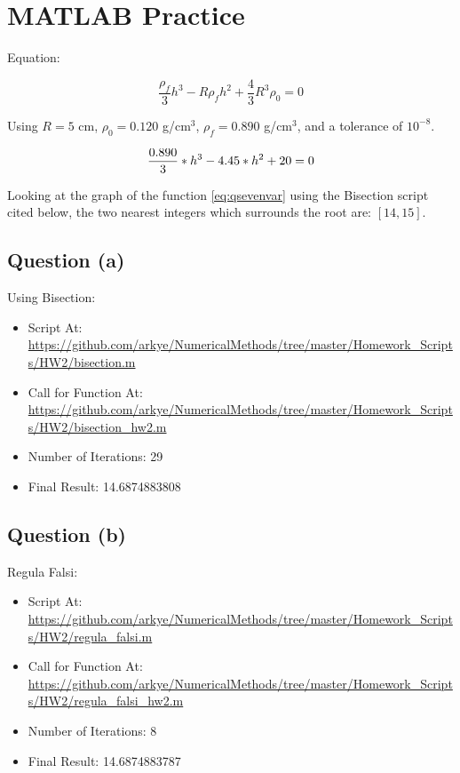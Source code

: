 \section{MATLAB Practice}
	Equation:
	
	\begin{equation}
		 \frac{\rho_{f}}{3}h^{3} - R \rho_{f}h^{2} + \frac{4}{3}R^{3} \rho_{0} = 0
	\label{eq:qseven}
	\end{equation}

	Using $R = 5$ cm, $\rho_{0} = 0.120$ g/cm$^3$, $\rho_{f} = 0.890$ g/cm$^3$, and a tolerance of $10^{-8}$.

	\begin{equation}
		 \frac{0.890}{3}*h^{3} - 4.45*h^{2} + 20 = 0 \notag \\
		\label{eq:qsevenvar}
	\end{equation}

	Looking at the graph of the function \cref{eq:qsevenvar} using the Bisection script cited below, the two nearest integers which surrounds the root are: $[14, 15]$.

	\subsection{Question (a)}

		Using Bisection:

		\begin{itemize} 
		 	\item{Script At: \url{https://github.com/arkye/NumericalMethods/tree/master/Homework_Scripts/HW2/bisection.m}}
		 	\item{Call for Function At: \url{https://github.com/arkye/NumericalMethods/tree/master/Homework_Scripts/HW2/bisection_hw2.m}}
		 	\item{Number of Iterations: 29}
		 	\item{Final Result: 14.6874883808}
		\end{itemize}

	\subsection{Question (b)}

		Regula Falsi:

		\begin{itemize} 
		 	\item{Script At: \url{https://github.com/arkye/NumericalMethods/tree/master/Homework_Scripts/HW2/regula_falsi.m}}
		 	\item{Call for Function At: \url{https://github.com/arkye/NumericalMethods/tree/master/Homework_Scripts/HW2/regula_falsi_hw2.m}}
		 	\item{Number of Iterations: 8}
		 	\item{Final Result: 14.6874883787}
		\end{itemize}

